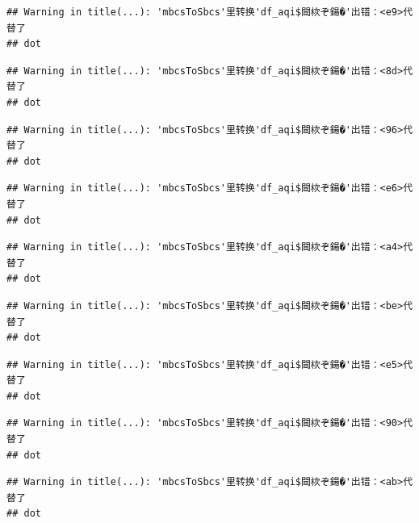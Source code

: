\documentclass[]{book}
\newenvironment{Shaded}{\begin{snugshade}}{\end{snugshade}}
\newcommand{\DataTypeTok}[1]{\textcolor[rgb]{0.13,0.29,0.53}{#1}}
\newcommand{\DecValTok}[1]{\textcolor[rgb]{0.00,0.00,0.81}{#1}}
\newcommand{\KeywordTok}[1]{\textcolor[rgb]{0.13,0.29,0.53}{\textbf{#1}}}
\newcommand{\NormalTok}[1]{#1}
\newcommand{\OperatorTok}[1]{\textcolor[rgb]{0.81,0.36,0.00}{\textbf{#1}}}
\newcommand{\StringTok}[1]{\textcolor[rgb]{0.31,0.60,0.02}{#1}}
\begin{document}
\begin{verbatim}
## Warning in title(...): 'mbcsToSbcs'里转换'df_aqi$閸栨ぞ鍚�'出错：<e9>代替了
## dot
\end{verbatim}

\begin{verbatim}
## Warning in title(...): 'mbcsToSbcs'里转换'df_aqi$閸栨ぞ鍚�'出错：<8d>代替了
## dot
\end{verbatim}

\begin{verbatim}
## Warning in title(...): 'mbcsToSbcs'里转换'df_aqi$閸栨ぞ鍚�'出错：<96>代替了
## dot
\end{verbatim}

\begin{verbatim}
## Warning in title(...): 'mbcsToSbcs'里转换'df_aqi$閸栨ぞ鍚�'出错：<e6>代替了
## dot
\end{verbatim}

\begin{verbatim}
## Warning in title(...): 'mbcsToSbcs'里转换'df_aqi$閸栨ぞ鍚�'出错：<a4>代替了
## dot
\end{verbatim}

\begin{verbatim}
## Warning in title(...): 'mbcsToSbcs'里转换'df_aqi$閸栨ぞ鍚�'出错：<be>代替了
## dot
\end{verbatim}

\begin{verbatim}
## Warning in title(...): 'mbcsToSbcs'里转换'df_aqi$閸栨ぞ鍚�'出错：<e5>代替了
## dot
\end{verbatim}

\begin{verbatim}
## Warning in title(...): 'mbcsToSbcs'里转换'df_aqi$閸栨ぞ鍚�'出错：<90>代替了
## dot
\end{verbatim}

\begin{verbatim}
## Warning in title(...): 'mbcsToSbcs'里转换'df_aqi$閸栨ぞ鍚�'出错：<ab>代替了
## dot
\end{verbatim}

\begin{Shaded}
\end{Shaded}
\end{document}
